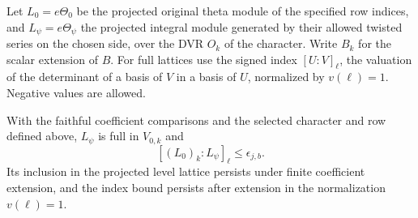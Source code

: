 Let \(L_0=e\Theta_0\) be the projected original theta module
of the specified row indices, and \(L_\psi=e\Theta_\psi\)
the projected integral module generated by their allowed
twisted series on the chosen side, over the DVR \(O_k\)
of the character. Write \(B_k\) for the scalar extension
of \(B\). For full lattices use the signed index
\([U:V]_\ell\), the valuation of the determinant of a basis
of \(V\) in a basis of \(U\), normalized by \(v(\ell)=1\).
Negative values are allowed.

\begin{proposition}
\label{prop:twisted-row-index}
With the faithful coefficient comparisons and the selected
character and row defined above, \(L_\psi\) is full in \(V_{0,k}\)
and
\[
          [(L_0)_k:L_\psi]_\ell\le\epsilon_{j,b}.
\]
Its inclusion in the projected level lattice persists under
finite coefficient extension, and the index bound persists after
extension in the normalization \(v(\ell)=1\).
\end{proposition}


